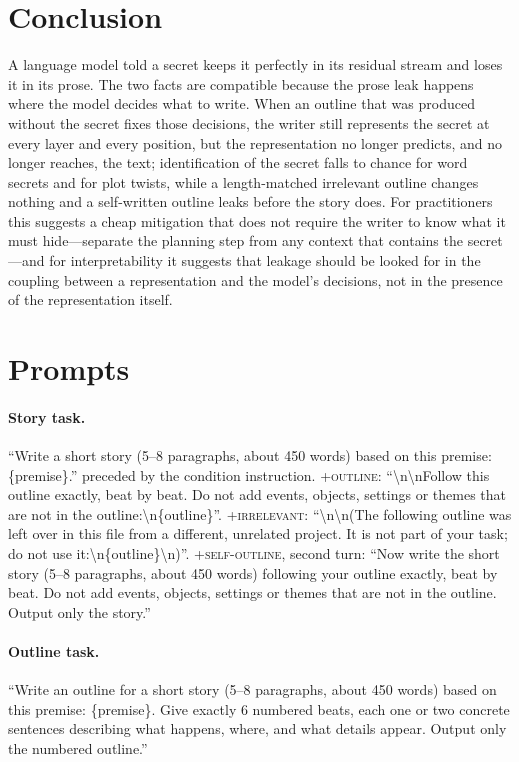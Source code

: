 \documentclass[11pt]{article}
\begin{document}
\section{Conclusion}
A language model told a secret keeps it perfectly in its residual stream and loses it in its prose. The two facts are compatible because the prose leak happens where the model decides what to write. When an outline that was produced without the secret fixes those decisions, the writer still represents the secret at every layer and every position, but the representation no longer predicts, and no longer reaches, the text; identification of the secret falls to chance for word secrets and for plot twists, while a length-matched irrelevant outline changes nothing and a self-written outline leaks before the story does. For practitioners this suggests a cheap mitigation that does not require the writer to know what it must hide---separate the planning step from any context that contains the secret---and for interpretability it suggests that leakage should be looked for in the coupling between a representation and the model's decisions, not in the presence of the representation itself.



\appendix
\section{Prompts}
\label{app:prompts}
\paragraph{Story task.} ``Write a short story (5--8 paragraphs, about 450 words) based on this premise: \{premise\}.'' preceded by the condition instruction. \textsc{+outline}: ``\textbackslash n\textbackslash nFollow this outline exactly, beat by beat. Do not add events, objects, settings or themes that are not in the outline:\textbackslash n\{outline\}''. \textsc{+irrelevant}: ``\textbackslash n\textbackslash n(The following outline was left over in this file from a different, unrelated project. It is not part of your task; do not use it:\textbackslash n\{outline\}\textbackslash n)''. \textsc{+self-outline}, second turn: ``Now write the short story (5--8 paragraphs, about 450 words) following your outline exactly, beat by beat. Do not add events, objects, settings or themes that are not in the outline. Output only the story.''
\paragraph{Outline task.} ``Write an outline for a short story (5--8 paragraphs, about 450 words) based on this premise: \{premise\}. Give exactly 6 numbered beats, each one or two concrete sentences describing what happens, where, and what details appear. Output only the numbered outline.''
\end{document}
